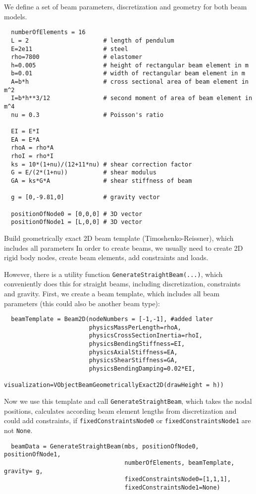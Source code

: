 \noindent We define a set of beam parameters, discretization and geometry for both beam models.
\pythonstyle\begin{lstlisting}
  numberOfElements = 16
  L = 2                     # length of pendulum 
  E=2e11                    # steel
  rho=7800                  # elastomer
  h=0.005                   # height of rectangular beam element in m
  b=0.01                    # width of rectangular beam element in m
  A=b*h                     # cross sectional area of beam element in m^2
  I=b*h**3/12               # second moment of area of beam element in m^4
  nu = 0.3                  # Poisson's ratio
      
  EI = E*I
  EA = E*A
  rhoA = rho*A
  rhoI = rho*I
  ks = 10*(1+nu)/(12+11*nu) # shear correction factor
  G = E/(2*(1+nu))          # shear modulus
  GA = ks*G*A               # shear stiffness of beam

  g = [0,-9.81,0]           # gravity vector

  positionOfNode0 = [0,0,0] # 3D vector
  positionOfNode1 = [L,0,0] # 3D vector
\end{lstlisting}

\noindent Build geometrically exact 2D beam template (Timoshenko-Reissner), which includes all parameters
In order to create beams, we usually need to create 2D rigid body nodes, 
create beam elements, add constraints and loads.

\noindent However, there is a utility function \texttt{GenerateStraightBeam(...)}, 
which conveniently does this for straight beams, including discretization, constraints and gravity.
First, we create a beam template, which includes all beam parameters (this could also be another beam type):
\pythonstyle\begin{lstlisting}
  beamTemplate = Beam2D(nodeNumbers = [-1,-1], #added later
                        physicsMassPerLength=rhoA,
                        physicsCrossSectionInertia=rhoI,
                        physicsBendingStiffness=EI,
                        physicsAxialStiffness=EA,
                        physicsShearStiffness=GA,
                        physicsBendingDamping=0.02*EI,
                        visualization=VObjectBeamGeometricallyExact2D(drawHeight = h))
\end{lstlisting}

\noindent Now we use this template and call \texttt{GenerateStraightBeam}, which takes the nodal positions,
calculates according beam element lengths from discretization and could add constraints,
if \texttt{fixedConstraintsNode0} or \texttt{fixedConstraintsNode1} are not \texttt{None}.
\pythonstyle\begin{lstlisting}
  beamData = GenerateStraightBeam(mbs, positionOfNode0, positionOfNode1, 
                                  numberOfElements, beamTemplate, gravity= g, 
                                  fixedConstraintsNode0=[1,1,1], 
                                  fixedConstraintsNode1=None)
\end{lstlisting}

